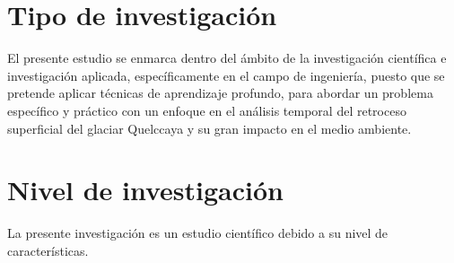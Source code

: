 \begin{comment}
\subsubsection{Investigaciones relevantes}
Uno de los estudios más notables sobre el Quelccaya fue llevado a cabo por un equipo de científicos liderado por el glaciólogo Lonnie Thompson, de la Universidad Estatal de Ohio, quien ha estado analizando los núcleos de hielo extraídos del glaciar desde la década de 1970. Estos estudios han permitido obtener información valiosa sobre el clima prehistórico, la variabilidad climática y los efectos del calentamiento global
\end{comment}
 
\section{Tipo de investigación}
El presente estudio se enmarca dentro del ámbito de la investigación científica e investigación aplicada, específicamente en el campo de ingeniería, puesto que se pretende aplicar técnicas de aprendizaje profundo, para abordar un problema específico y práctico con un enfoque en el análisis temporal del retroceso superficial del glaciar Quelccaya y su gran impacto en el medio ambiente.  
\section{Nivel de investigación}
La presente investigación es un estudio científico debido a su nivel de características.

